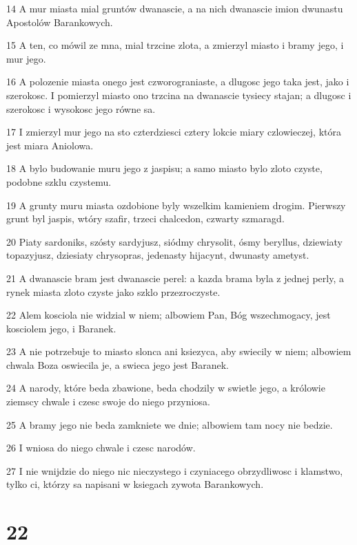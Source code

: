 \par 14 A mur miasta mial gruntów dwanascie, a na nich dwanascie imion dwunastu Apostolów Barankowych.
\par 15 A ten, co mówil ze mna, mial trzcine zlota, a zmierzyl miasto i bramy jego, i mur jego.
\par 16 A polozenie miasta onego jest czworograniaste, a dlugosc jego taka jest, jako i szerokosc. I pomierzyl miasto ono trzcina na dwanascie tysiecy stajan; a dlugosc i szerokosc i wysokosc jego równe sa.
\par 17 I zmierzyl mur jego na sto czterdziesci cztery lokcie miary czlowieczej, która jest miara Aniolowa.
\par 18 A bylo budowanie muru jego z jaspisu; a samo miasto bylo zloto czyste, podobne szklu czystemu.
\par 19 A grunty muru miasta ozdobione byly wszelkim kamieniem drogim. Pierwszy grunt byl jaspis, wtóry szafir, trzeci chalcedon, czwarty szmaragd.
\par 20 Piaty sardoniks, szósty sardyjusz, siódmy chrysolit, ósmy beryllus, dziewiaty topazyjusz, dziesiaty chrysopras, jedenasty hijacynt, dwunasty ametyst.
\par 21 A dwanascie bram jest dwanascie perel: a kazda brama byla z jednej perly, a rynek miasta zloto czyste jako szklo przezroczyste.
\par 22 Alem kosciola nie widzial w niem; albowiem Pan, Bóg wszechmogacy, jest kosciolem jego, i Baranek.
\par 23 A nie potrzebuje to miasto slonca ani ksiezyca, aby swiecily w niem; albowiem chwala Boza oswiecila je, a swieca jego jest Baranek.
\par 24 A narody, które beda zbawione, beda chodzily w swietle jego, a królowie ziemscy chwale i czesc swoje do niego przyniosa.
\par 25 A bramy jego nie beda zamkniete we dnie; albowiem tam nocy nie bedzie.
\par 26 I wniosa do niego chwale i czesc narodów.
\par 27 I nie wnijdzie do niego nic nieczystego i czyniacego obrzydliwosc i klamstwo, tylko ci, którzy sa napisani w ksiegach zywota Barankowych.

\chapter{22}

